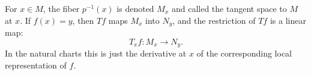For $x \in M$, the fiber $p^{-1}(x)$ is denoted $M_x$ and called the tangent space to $M$ at $x$. If $f(x) = y$, then $Tf$ maps $M_x$ into $N_y$, and the restriction of $Tf$ is a linear map:
$$T_x f: M_x \to N_y.$$
In the natural charts this is just the derivative at $x$ of the corresponding local representation of $f$.
